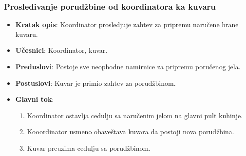 \subsubsection{Prosleđivanje porudžbine od koordinatora ka kuvaru}
\begin{itemize}
    \item \textbf{Kratak opis}:
    Koordinator prosledjuje zahtev za pripremu naručene hrane kuvaru.
    \item \textbf{Učesnici}:
    Koordinator, kuvar.
    \item \textbf{Preduslovi}:
    Postoje sve neophodne namirnice za pripremu poručenog jela.
    \item \textbf{Postuslovi}:
    Kuvar je primio zahtev za porudžbinom.
    \item \textbf{Glavni tok}:
   \begin{enumerate}
        \item Koordinator ostavlja cedulju sa naručenim jelom na glavni pult kuhinje.
        \item Kooordinator usmeno obaveštava kuvara da postoji nova porudžbina.
        \item Kuvar preuzima cedulju sa porudžbinom.
\end{enumerate}
\end{itemize}
 